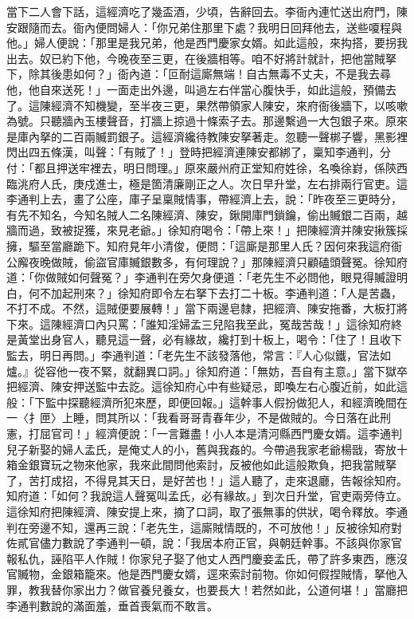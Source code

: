 當下二人會下話，這經濟吃了幾盃酒，少頃，告辭回去。李衙內連忙送出府門，陳安跟隨而去。衙內便問婦人：「你兄弟住那里下處？我明日回拜他去，送些嗄程與他。」婦人便說：「那里是我兄弟，他是西門慶家女婿。如此這般，來抅搭，要拐我出去。奴已約下他，今晚夜至三更，在後牆相等。咱不好將計就計，把他當賊拏下，除其後患如何？」衙內道：「叵耐這廝無端！自古無毒不丈夫，不是我去尋他，他自來送死！」一面走出外邊，叫過左右伴當心腹快手，如此這般，預備去了。這陳經濟不知機變，至半夜三更，果然帶領家人陳安，來府衙後牆下，以咳嗽為號。只聽牆內玉樓聲音，打牆上掠過十條索子去。那邊繫過一大包銀子來。原來是庫內拏的二百兩贓罰銀子。這經濟纔待教陳安拏著走。忽聽一聲梆子響，黑影裡閃出四五條漢，叫聲：「有賊了！」登時把經濟連陳安都綁了，稟知李通判，分付：「都且押送牢裡去，明日問理。」原來嚴州府正堂知府姓徐，名喚徐崶，係陝西臨洮府人氏，庚戍進士，極是箇清廉剛正之人。次日早升堂，左右排兩行官吏。這李通判上去，畫了公座，庫子呈稟賊情事，帶經濟上去，說：「昨夜至三更時分，有先不知名，今知名賊人二名陳經濟、陳安，鍬開庫門鎖鑰，偷出贓銀二百兩，越牆而過，致被捉獲，來見老爺。」徐知府喝令：「帶上來！」把陳經濟并陳安揪簇採擁，驅至當廳跪下。知府見年小清俊，便問：「這廝是那里人氏？因何來我這府衙公廨夜晚做賊，偷盜官庫贓銀數多，有何理說？」那陳經濟只顧磕頭聲冤。徐知府道：「你做賊如何聲冤？」李通判在旁欠身便道：「老先生不必問他，眼見得贓證明白，何不加起刑來？」徐知府即令左右拏下去打二十板。李通判道：「人是苦蟲，不打不成。不然，這賊便要展轉！」當下兩邊皂隸，把經濟、陳安拖番，大板打將下來。這陳經濟口內只罵：「誰知淫婦孟三兒陷我至此，冤哉苦哉！」這徐知府終是黃堂出身官人，聽見這一聲，必有緣故，纔打到十板上，喝令：「住了！且收下監去，明日再問。」李通判道：「老先生不該發落他，常言：『人心似鐵，官法如爐。』從容他一夜不緊，就翻異口詞。」徐知府道：「無妨，吾自有主意。」當下獄卒把經濟、陳安押送監中去訖。這徐知府心中有些疑忌，即喚左右心腹近前，如此這般：「下監中探聽經濟所犯來歷，即便回報。」這幹事人假扮做犯人，和經濟晚間在一〈扌匣〉上睡，問其所以：「我看哥哥青春年少，不是做賊的。今日落在此刑憲，打屈官司！」經濟便說：「一言難盡！小人本是清河縣西門慶女婿。這李通判兒子新娶的婦人孟氏，是俺丈人的小，舊與我姦的。今帶過我家老爺楊戩，寄放十箱金銀寶玩之物來他家，我來此間問他索討，反被他如此這般欺負，把我當賊拏了，苦打成招，不得見其天日，是好苦也！」這人聽了，走來退廳，告報徐知府。知府道：「如何？我說這人聲冤叫孟氏，必有緣故。」到次日升堂，官吏兩旁侍立。這徐知府把陳經濟、陳安提上來，摘了口詞，取了張無事的供狀，喝令釋放。李通判在旁邊不知，還再三說：「老先生，這廝賊情既的，不可放他！」反被徐知府對佐貳官儘力數說了李通判一頓，說：「我居本府正官，與朝廷幹事。不該與你家官報私仇，誣陷平人作賊！你家兒子娶了他丈人西門慶妾孟氏，帶了許多東西，應沒官贓物，金銀箱籠來。他是西門慶女婿，逕來索討前物。你如何假捏賊情，拏他入罪，教我替你家出力？做官養兒養女，也要長大！若然如此，公道何堪！」當廳把李通判數說的滿面羞，垂首喪氣而不敢言。

